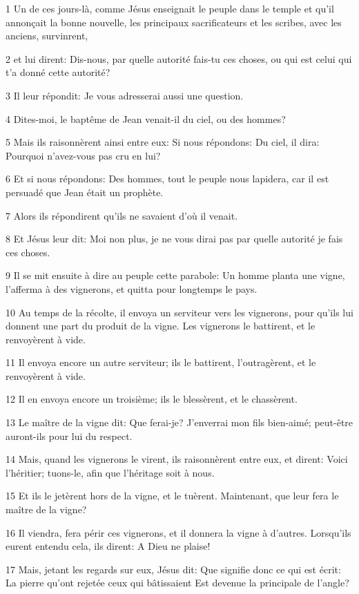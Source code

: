 \par 1 Un de ces jours-là, comme Jésus enseignait le peuple dans le temple et qu'il annonçait la bonne nouvelle, les principaux sacrificateurs et les scribes, avec les anciens, survinrent,
\par 2 et lui dirent: Dis-nous, par quelle autorité fais-tu ces choses, ou qui est celui qui t'a donné cette autorité?
\par 3 Il leur répondit: Je vous adresserai aussi une question.
\par 4 Dites-moi, le baptême de Jean venait-il du ciel, ou des hommes?
\par 5 Mais ils raisonnèrent ainsi entre eux: Si nous répondons: Du ciel, il dira: Pourquoi n'avez-vous pas cru en lui?
\par 6 Et si nous répondons: Des hommes, tout le peuple nous lapidera, car il est persuadé que Jean était un prophète.
\par 7 Alors ils répondirent qu'ils ne savaient d'où il venait.
\par 8 Et Jésus leur dit: Moi non plus, je ne vous dirai pas par quelle autorité je fais ces choses.
\par 9 Il se mit ensuite à dire au peuple cette parabole: Un homme planta une vigne, l'afferma à des vignerons, et quitta pour longtemps le pays.
\par 10 Au temps de la récolte, il envoya un serviteur vers les vignerons, pour qu'ils lui donnent une part du produit de la vigne. Les vignerons le battirent, et le renvoyèrent à vide.
\par 11 Il envoya encore un autre serviteur; ils le battirent, l'outragèrent, et le renvoyèrent à vide.
\par 12 Il en envoya encore un troisième; ils le blessèrent, et le chassèrent.
\par 13 Le maître de la vigne dit: Que ferai-je? J'enverrai mon fils bien-aimé; peut-être auront-ils pour lui du respect.
\par 14 Mais, quand les vignerons le virent, ils raisonnèrent entre eux, et dirent: Voici l'héritier; tuons-le, afin que l'héritage soit à nous.
\par 15 Et ils le jetèrent hors de la vigne, et le tuèrent. Maintenant, que leur fera le maître de la vigne?
\par 16 Il viendra, fera périr ces vignerons, et il donnera la vigne à d'autres. Lorsqu'ils eurent entendu cela, ils dirent: A Dieu ne plaise!
\par 17 Mais, jetant les regards sur eux, Jésus dit: Que signifie donc ce qui est écrit: La pierre qu'ont rejetée ceux qui bâtissaient Est devenue la principale de l'angle?
